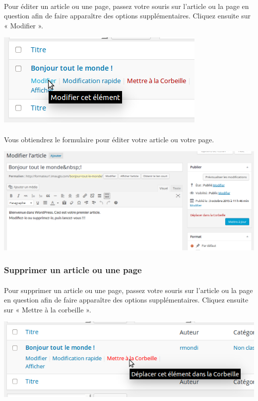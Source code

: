 \documentclass[10pt,a4paper]{article}
\begin{document}
\paragraph{}Pour éditer un article ou une page, passez votre souris sur l'article ou la page en question afin de faire apparaître des options supplémentaires. Cliquez ensuite sur « Modifier ».
\begin{center}
\includegraphics[scale=0.35]{img/0066.png}
\end{center}
\paragraph{}Vous obtiendrez le formulaire pour éditer votre article ou votre page.
\begin{center}
\includegraphics[scale=0.35]{img/0067.png}
\end{center}
\subsubsection{Supprimer un article ou une page}
\paragraph{}Pour supprimer un article ou une page, passez votre souris sur l'article ou la page en question afin de faire apparaître des options supplémentaires. Cliquez ensuite sur « Mettre à la corbeille ».
\begin{center}
\includegraphics[scale=0.35]{img/0068.png}
\end{center}
\end{document}
